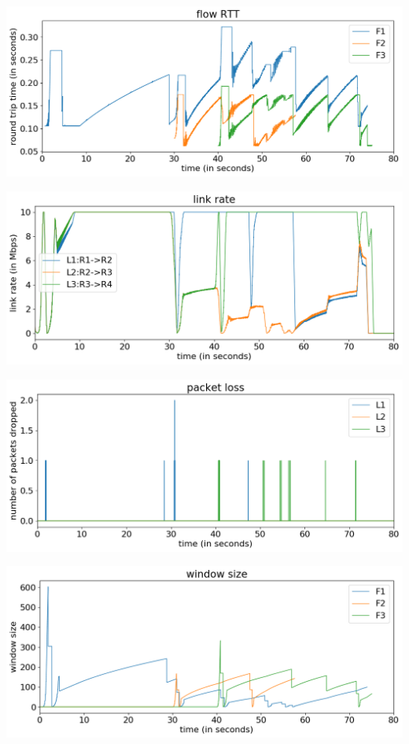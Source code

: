 \documentclass{article}
\begin{document}
\includegraphics[width = \textwidth]{"test_case2_reno flow RTT"}

\includegraphics[width = \textwidth]{"test_case2_reno link rate"}

\includegraphics[width = \textwidth]{"test_case2_reno packet loss"}

\includegraphics[width = \textwidth]{"test_case2_reno window size"}
\end{document}
